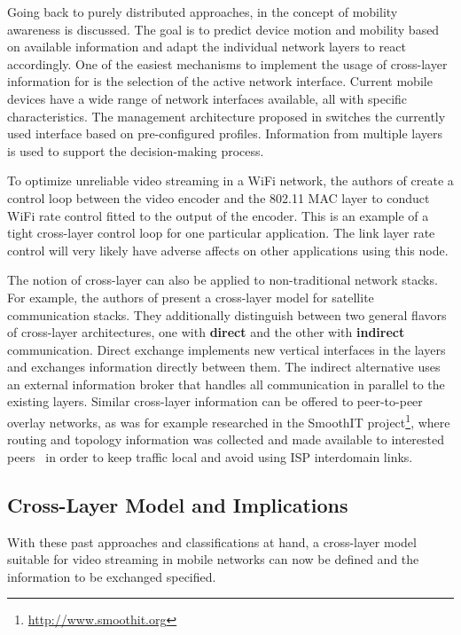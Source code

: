 Going back to purely distributed approaches, in \cite{hummel2010mobilitaet} the concept of mobility awareness is discussed. The goal is to predict device motion and mobility based on available information and adapt the individual network layers to react accordingly. One of the easiest mechanisms to implement the usage of cross-layer information for is the selection of the active network interface. Current mobile devices have a wide range of network interfaces available, all with specific characteristics. The management architecture proposed in  \cite{Bonnin:2009:AMM:1503496.1503498} switches the currently used interface based on pre-configured profiles. Information from multiple layers is used to support the decision-making process.

To optimize unreliable video streaming in a WiFi network, the authors of \cite{1580941} create a control loop between the video encoder and the 802.11 \gls{MAC} layer to conduct WiFi rate control fitted to the output of the encoder. This is an example of a tight cross-layer control loop for one particular application. The link layer rate control will very likely have adverse affects on other applications using this node.

The notion of cross-layer can also be applied to non-traditional network stacks. For example, the authors of \cite{4656786} present a cross-layer model for satellite communication stacks. They additionally distinguish between two general flavors of cross-layer architectures, one with \textbf{direct} and the other with \textbf{indirect} communication. Direct exchange implements new vertical interfaces in the layers and exchanges information directly between them. The indirect alternative uses an external information broker that handles all communication in parallel to the existing layers. Similar cross-layer information can be offered to peer-to-peer overlay networks, as was for example researched in the SmoothIT project\footnote{\url{http://www.smoothit.org}}, where routing and topology information was collected and made available to interested peers~\cite{oechsner2009pushing} in order to keep traffic local and avoid using \acrshort{ISP} interdomain links.


\subsection{Cross-Layer Model and Implications}

With these past approaches and classifications at hand, a cross-layer model suitable for video streaming in mobile networks can now be defined and the information to be exchanged specified.

